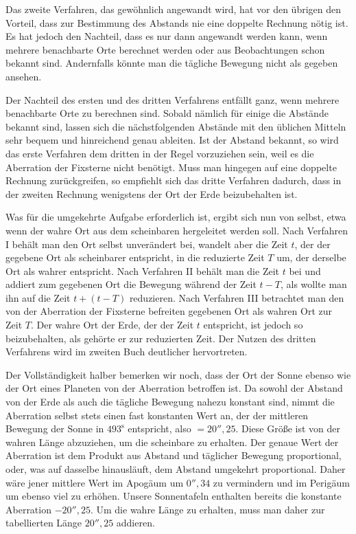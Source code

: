 Das zweite Verfahren, das gewöhnlich angewandt wird, hat vor den übrigen den Vorteil, dass zur Bestimmung des Abstands nie eine doppelte Rechnung nötig ist. Es hat jedoch den Nachteil, dass es nur dann angewandt werden kann, wenn mehrere benachbarte Orte berechnet werden oder aus Beobachtungen schon bekannt sind. Andernfalls könnte man die tägliche Bewegung nicht als gegeben ansehen.

Der Nachteil des ersten und des dritten Verfahrens entfällt ganz, wenn mehrere benachbarte Orte zu berechnen sind. Sobald nämlich für einige die Abstände bekannt sind, lassen sich die nächstfolgenden Abstände mit den üblichen Mitteln sehr bequem und hinreichend genau ableiten. Ist der Abstand bekannt, so wird das erste Verfahren dem dritten in der Regel vorzuziehen sein, weil es die Aberration der Fixsterne nicht benötigt. Muss man hingegen auf eine doppelte Rechnung zurückgreifen, so empfiehlt sich das dritte Verfahren dadurch, dass in der zweiten Rechnung wenigstens der Ort der Erde beizubehalten ist.

Was für die umgekehrte Aufgabe erforderlich ist, ergibt sich nun von selbst, etwa wenn der wahre Ort aus dem scheinbaren hergeleitet werden soll. Nach Verfahren I behält man den Ort selbst unverändert bei, wandelt aber die Zeit $t$, der der gegebene Ort als scheinbarer entspricht, in die reduzierte Zeit $T$ um, der derselbe Ort als wahrer entspricht. Nach Verfahren II behält man die Zeit $t$ bei und addiert zum gegebenen Ort die Bewegung während der Zeit $t-T$, als wollte man ihn auf die Zeit $t+(t-T)$ reduzieren. Nach Verfahren III betrachtet man den von der Aberration der Fixsterne befreiten gegebenen Ort als wahren Ort zur Zeit $T$. Der wahre Ort der Erde, der der Zeit $t$ entspricht, ist jedoch so beizubehalten, als gehörte er zur reduzierten Zeit. Der Nutzen des dritten Verfahrens wird im zweiten Buch deutlicher hervortreten.

Der Vollständigkeit halber bemerken wir noch, dass der Ort der Sonne ebenso wie der Ort eines Planeten von der Aberration betroffen ist. Da sowohl der Abstand von der Erde als auch die tägliche Bewegung nahezu konstant sind, nimmt die Aberration selbst stets einen fast konstanten Wert an, der der mittleren Bewegung der Sonne in $493^{\mathrm{s}}$ entspricht, also $=20''{,}25$. Diese Größe ist von der wahren Länge abzuziehen, um die scheinbare zu erhalten. Der genaue Wert der Aberration ist dem Produkt aus Abstand und täglicher Bewegung proportional, oder, was auf dasselbe hinausläuft, dem Abstand umgekehrt proportional. Daher wäre jener mittlere Wert im Apogäum um $0''{,}34$ zu vermindern und im Perigäum um ebenso viel zu erhöhen. Unsere Sonnentafeln enthalten bereits die konstante Aberration $-20''{,}25$. Um die wahre Länge zu erhalten, muss man daher zur tabellierten Länge $20''{,}25$ addieren.

